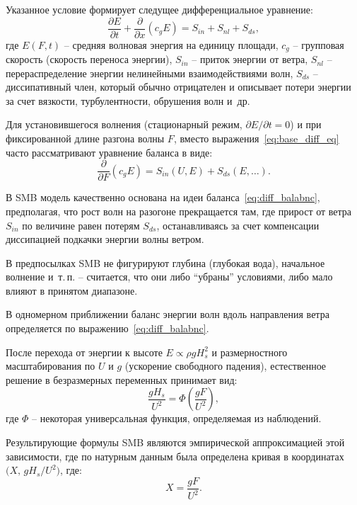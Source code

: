 Указанное условие формирует следущее дифференциальное уравнение:
\begin{equation}
    \frac{\partial E}{\partial t} + \frac{\partial}{\partial x}(c_g E) = S_{in} + S_{nl} + S_{ds},\label{eq:base_diff_eq}
\end{equation}
где 
$E(F,t)$ -- средняя волновая энергия на единицу площади, 
$c_g$ -- групповая скорость (скорость переноса энергии),
$S_{in}$ -- приток энергии от ветра,
$S_{nl}$ -- перераспределение энергии нелинейными взаимодействиями волн,
$S_{ds}$ -- диссипативный член, который обычно отрицателен и описывает потери энергии за счет вязкости, турбулентности, обрушения волн и~др.

Для установившегося волнения (стационарный режим, $\partial E / \partial t = 0$) и при фиксированной  длине разгона волны $F$, вместо выражения~\eqref{eq:base_diff_eq} часто рассматривают уравнение баланса в виде:
\begin{equation}\label{eq:diff_balabnc}
    \frac{\partial}{\partial F}(c_g E) = S_{in}(U, E) + S_{ds}(E, \ldots).
\end{equation}

В SMB модель качественно основана на идеи баланса~\eqref{eq:diff_balabnc}, предполагая, что рост волн на разогоне прекращается там, где прирост от ветра $S_{in}$ по величине равен потерям $S_{ds}$, останавливаясь за счет компенсации диссипацией подкачки энергии волны ветром.


В предпосылках SMB не фигурируют глубина (глубокая вода), начальное волнение и~т.\,п. -- считается, что они либо \enquote{убраны} условиями, либо мало влияют в принятом диапазоне.

В одномерном приближении баланс энергии волн вдоль направления ветра определяется по выражению~\eqref{eq:diff_balabnc}.
 
После перехода от энергии к высоте $E \propto \rho g H_s^2$ и размерностного масштабирования по $U$ и $g$ (ускорение свободного падения), естественное решение в безразмерных переменных принимает вид:
\begin{equation}
    \frac{g H_s}{U^2} = \Phi\!\left(\frac{g F}{U^2}\right),
\end{equation}
где $\Phi$ -- некоторая универсальная функция, определяемая из наблюдений.

Результирующие формулы SMB являются эмпирической аппроксимацией этой зависимости, где по натурным данным была определена кривая в координатах $\bigl(X,\, g H_s/U^2\bigr)$, где:
\begin{equation}
    X = \frac{g F}{U^2}.
\end{equation}

